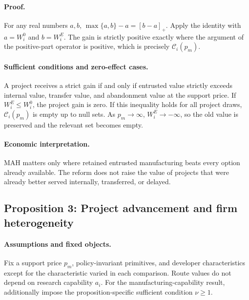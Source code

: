 \paragraph{Proof.}
For any real numbers \(a,b\),
\(\max\{a,b\}-a=[b-a]_+\). Apply the identity with
\(a=W_i^0\) and \(b=W_i^E\). The gain is strictly positive exactly where the
argument of the positive-part operator is positive, which is precisely
\(\mathcal C_i(p_m)\).

\paragraph{Sufficient conditions and zero-effect cases.}
A project receives a strict gain if and only if entrusted value strictly
exceeds internal value, transfer value, and abandonment value at the support
price. If \(W_i^E\leq W_i^0\), the project gain is zero. If this inequality
holds for all project draws, \(\mathcal C_i(p_m)\) is empty up to null sets.
As \(p_m\rightarrow\infty\), \(W_i^E\rightarrow-\infty\), so the old value is
preserved and the relevant set becomes empty.

\paragraph{Economic interpretation.}
MAH matters only where retained entrusted manufacturing beats every option
already available. The reform does not raise the value of projects that were
already better served internally, transferred, or delayed.

\subsection{Proposition 3: Project advancement and firm heterogeneity}
\label{prop:p08-advancement}

\paragraph{Assumptions and fixed objects.}
Fix a support price \(p_m\), policy-invariant primitives, and developer
characteristics except for the characteristic varied in each comparison.
Route values do not depend on research capability \(a_i\). For the
manufacturing-capability result, additionally impose the proposition-specific
sufficient condition \(\nu\geq1\).

